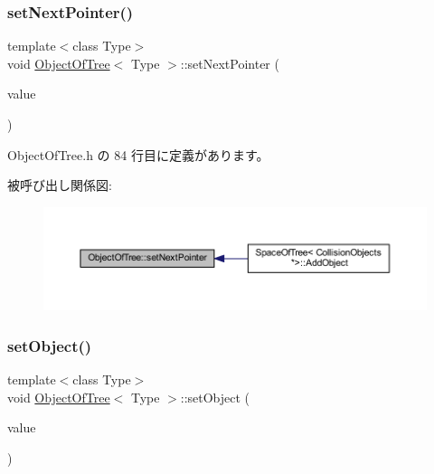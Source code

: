\subsubsection{\texorpdfstring{set\+Next\+Pointer()}{setNextPointer()}}
{\footnotesize\ttfamily template$<$class Type$>$ \\
void \mbox{\hyperlink{class_object_of_tree}{Object\+Of\+Tree}}$<$ Type $>$\+::set\+Next\+Pointer (\begin{DoxyParamCaption}\item[{\mbox{\hyperlink{class_object_of_tree}{Object\+Of\+Tree}}$<$ Type $>$ $\ast$}]{value }\end{DoxyParamCaption})\hspace{0.3cm}{\ttfamily [inline]}}



 Object\+Of\+Tree.\+h の 84 行目に定義があります。

被呼び出し関係図\+:\nopagebreak
\begin{figure}[H]
\begin{center}
\leavevmode
\includegraphics[width=350pt]{class_object_of_tree_a44fb225ed189197bcdfe23dcd2a7fe28_icgraph}
\end{center}
\end{figure}
\mbox{\label{class_object_of_tree_aae14cb0e8ac8b701de737c547a1d3b8c}} 
\subsubsection{\texorpdfstring{set\+Object()}{setObject()}}
{\footnotesize\ttfamily template$<$class Type$>$ \\
void \mbox{\hyperlink{class_object_of_tree}{Object\+Of\+Tree}}$<$ Type $>$\+::set\+Object (\begin{DoxyParamCaption}\item[{Type}]{value }\end{DoxyParamCaption})\hspace{0.3cm}{\ttfamily [inline]}}



